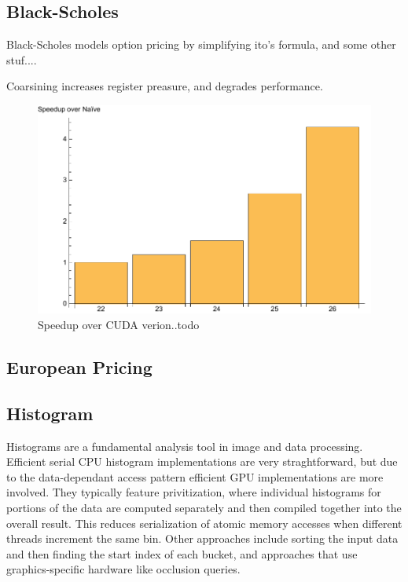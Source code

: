 \subsection{Black-Scholes}
Black-Scholes models option pricing by simplifying ito's formula, and some other stuf....


Coarsining increases register preasure, and degrades performance.


\begin{figure}
\centering
\includegraphics[scale=0.5]{data/blackscholes.pdf}
\caption{Speedup over CUDA verion..todo}
\label{fig:blackscholes}
\centering
\end{figure}


\subsection{European Pricing}


\subsection{Histogram}
Histograms are a fundamental analysis tool in image and data processing.
Efficient serial CPU histogram implementations are very straghtforward, but
due to the data-dependant access pattern efficient GPU implementations are
more involved. They typically feature privitization,
where individual histograms for portions of the data are computed separately
and then compiled together into the overall result. This reduces serialization
of atomic memory accesses when different threads increment the same bin.
Other approaches include sorting the input data and then finding the start
index of each bucket, and approaches that use graphics-specific hardware like
occlusion queries.

